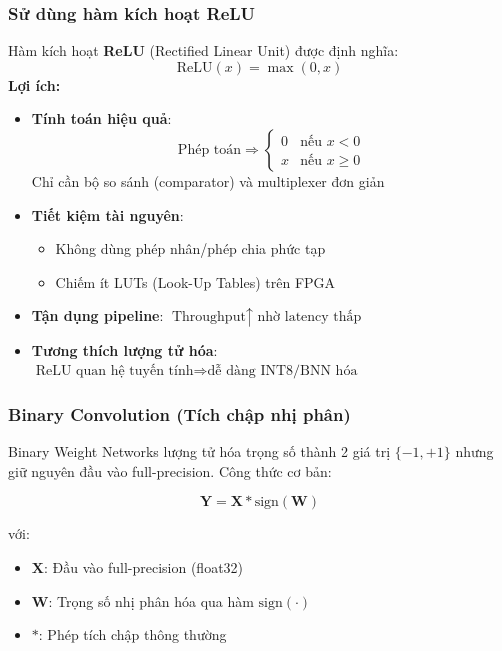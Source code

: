 \subsubsection{Sử dùng hàm kích hoạt ReLU}
Hàm kích hoạt \textbf{ReLU} (Rectified Linear Unit) được định nghĩa:
\begin{equation}
    \text{ReLU}(x) = \max(0, x)
\end{equation}
\textbf{Lợi ích:}
\begin{itemize}
    \item \textbf{Tính toán hiệu quả}:
    \begin{equation}
        \text{Phép toán} \Rightarrow \begin{cases} 
        0 & \text{nếu } x < 0 \\
        x & \text{nếu } x \geq 0 
        \end{cases}
    \end{equation}
    Chỉ cần bộ so sánh (comparator) và multiplexer đơn giản
    
    \item \textbf{Tiết kiệm tài nguyên}:
    \begin{itemize}
        \item Không dùng phép nhân/phép chia phức tạp
        \item Chiếm ít LUTs (Look-Up Tables) trên FPGA
    \end{itemize}
    
    \item \textbf{Tận dụng pipeline}:
    $
        \text{Throughput} \uparrow \text{ nhờ latency thấp}
    $
    
    \item \textbf{Tương thích lượng tử hóa}:
    $
        \text{ReLU quan hệ tuyến tính} \Rightarrow \text{dễ dàng INT8/BNN hóa}
    $

\end{itemize}

\subsubsection{Binary Convolution (Tích chập nhị phân)}
Binary Weight Networks lượng tử hóa trọng số thành 2 giá trị $\{-1, +1\}$ nhưng giữ nguyên đầu vào full-precision. Công thức cơ bản:

\begin{equation}
    \mathbf{Y} = \mathbf{X} \ast \text{sign}(\mathbf{W})
\end{equation}

\noindent với:
\begin{itemize}
    \item $\mathbf{X}$: Đầu vào full-precision (float32)
    \item $\mathbf{W}$: Trọng số nhị phân hóa qua hàm $\text{sign}(\cdot)$
    \item $\ast$: Phép tích chập thông thường
\end{itemize}

